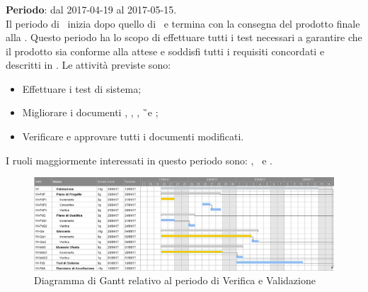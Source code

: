 		\subsubsection{\VV}
		\textbf{Periodo}: dal 2017-04-19 al 2017-05-15.\\
		Il periodo di \VV\ inizia dopo quello di \CO\ e termina con la consegna del prodotto finale alla \RA. Questo periodo ha lo scopo di effettuare tutti i test necessari a garantire che il prodotto sia conforme alla attese e soddisfi tutti i requisiti concordati e descritti in \AdR. Le attività previste sono:
		\begin{itemize}
			\item Effettuare i test di sistema;
			\item Migliorare i documenti \NdP, \PdP, \PdQ, \G\ e \MU;
			\item Verificare e approvare tutti i documenti modificati.
		\end{itemize}
			I ruoli maggiormente interessati in questo periodo sono: \textit{\Res}, \textit{\Prog}\ e \textit{\Ver}.
			
		\begin{figure}[H]
			\centering
			\includegraphics[scale=0.34]{img/ganttnetbreak6.png}
			\caption{Diagramma di Gantt relativo al periodo di Verifica e Validazione}
		\end{figure}
